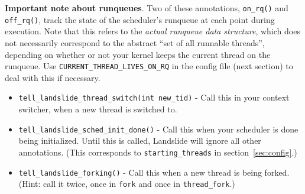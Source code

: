 \documentclass{article}
\begin{document}
{\bf Important note about runqueues}.
Two of these annotations, \texttt{on\_rq()} and \texttt{off\_rq()}, track the state of the scheduler's runqueue at each point during execution.
Note that this refers to the {\em actual runqueue data structure}, which does not necessarily correspond to the abstract ``set of all runnable threads'', depending on whether or not your kernel keeps the current thread on the runqueue. Use \texttt{CURRENT\_THREAD\_LIVES\_ON\_RQ} in the config file (next section) to deal with this if necessary.

\begin{itemize}
	\item \texttt{tell\_landslide\_thread\_switch(int new\_tid)} - Call this in your context switcher, when a new thread is switched to.
	\item \texttt{tell\_landslide\_sched\_init\_done()} - Call this when your scheduler is done being initialized. Until this is called, Landslide will ignore all other annotations. (This corresponds to \texttt{starting\_threads} in section~\ref{sec:config}.)
	\item \texttt{tell\_landslide\_forking()} - Call this when a new thread is being forked.
		(Hint: call it twice, once in \texttt{fork} and once in \texttt{thread\_fork}.)


\end{itemize}
\end{document}
